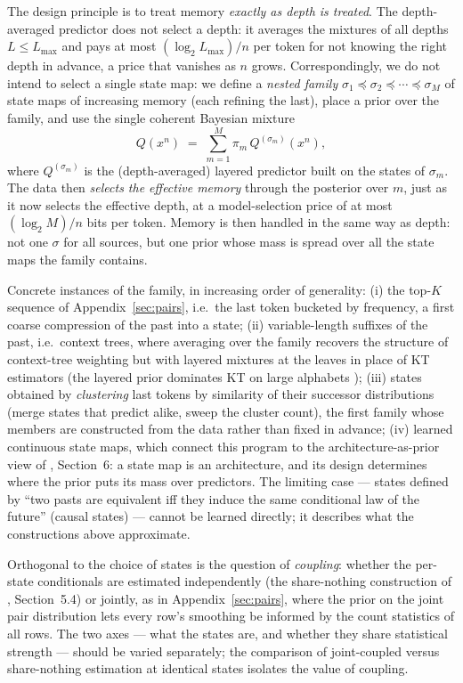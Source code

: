 \documentclass[11pt]{article}
\begin{document}
The design principle is to treat memory \emph{exactly as depth is treated}.
The depth-averaged predictor does not select a depth: it averages the
mixtures of all depths $L \le L_{\max}$ and pays at most
$(\log_2 L_{\max})/n$ per token for not knowing the right depth in
advance, a price that vanishes as $n$ grows.  Correspondingly, we
do not intend to select a single state map: we define a \emph{nested
family} $\sigma_1 \preceq \sigma_2 \preceq \cdots \preceq \sigma_M$ of
state maps of increasing memory (each refining the last), place a prior
over the family, and use the single coherent Bayesian mixture
\begin{equation}
\label{eq:state-average}
  Q(x^n) \;=\; \sum_{m=1}^{M} \pi_m\, Q^{(\sigma_m)}(x^n),
\end{equation}
where $Q^{(\sigma_m)}$ is the (depth-averaged) layered predictor built on
the states of $\sigma_m$.  The data then \emph{selects the effective
memory} through the posterior over $m$, just as it now selects the
effective depth, at a model-selection price of at most $(\log_2 M)/n$ bits
per token.  Memory is then handled in the same way as depth: not one
$\sigma$ for all sources, but one prior whose mass is spread over all the
state maps the family contains.

Concrete instances of the family, in increasing order of generality:
(i) the top-$K$ sequence of Appendix~\ref{sec:pairs}, i.e.\ the last token
bucketed by frequency, a first coarse compression of the past into a
state; (ii) variable-length suffixes of the past, i.e.\ context trees,
where averaging over the family recovers the structure of context-tree
weighting but with layered mixtures at the leaves in place of KT
estimators (the layered prior dominates KT on large alphabets
\cite{layered2026}); (iii) states obtained by \emph{clustering} last
tokens by similarity of their successor distributions (merge states that
predict alike, sweep the cluster count), the first family whose members
are constructed from the data rather than fixed in advance;
(iv) learned continuous state maps, which connect this program to the
architecture-as-prior view of \cite{layered2026}, Section~6: a state map
is an architecture, and its design determines where the prior puts its
mass over predictors.  The limiting case --- states defined by ``two
pasts are equivalent iff they induce the same conditional law of the
future'' (causal states) --- cannot be learned directly; it describes
what the constructions above approximate.

Orthogonal to the choice of states is the question of \emph{coupling}:
whether the per-state conditionals are estimated independently (the
share-nothing construction of \cite{layered2026}, Section~5.4) or jointly,
as in Appendix~\ref{sec:pairs}, where the prior on the joint pair
distribution lets every row's smoothing be informed by the count
statistics of all rows.  The two axes --- what the states are, and whether
they share statistical strength --- should be varied separately; the
comparison of joint-coupled versus share-nothing estimation at identical
states isolates the value of coupling.
\end{document}
